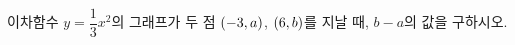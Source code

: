 이차함수 $y=\dfrac{1}{3}x^2$의 그래프가 두 점 $(-3{,}\mkern3mu\mathopen{}a)$, $(6{,}\mkern3mu\mathopen{}b)$를 지날 때, $b-a$의 값을 구하시오.
